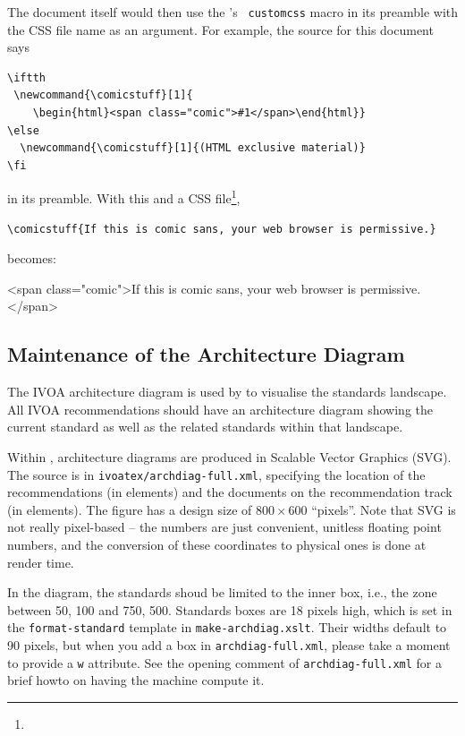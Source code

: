\documentclass[11pt,a4paper]{ivoa}
\newcommand{\texword}[1]{\texttt{\color{texcolor} #1}}
\newcommand{\comicstuff}[1]{
    \begin{html}<span class="comic">#1</span>\end{html}}
\newcommand{\comicstuff}[1]{(HTML exclusive material)}
\begin{document}
The document itself would then use the \ivoatex's \texword{customcss}
macro in its preamble with the CSS file name as an argument.  For
example, the source for this document says

\begin{lstlisting}
\iftth
 \newcommand{\comicstuff}[1]{
    \begin{html}<span class="comic">#1</span>\end{html}}
\else
  \newcommand{\comicstuff}[1]{(HTML exclusive material)}
\fi
\end{lstlisting}

\noindent in its preamble.  With this and a CSS
file\footnote{},

\begin{lstlisting}
\comicstuff{If this is comic sans, your web browser is permissive.}
\end{lstlisting}

\noindent becomes:
\comicstuff{If this is comic sans, your web browser is permissive.}

\subsection{Maintenance of the Architecture Diagram}

The IVOA architecture diagram is used by
\citet{2021ivoa.spec.1101D} to
visualise the standards landscape.  All IVOA recommendations should have
an architecture diagram showing the current standard as well as the
related standards within that landscape.

Within \ivoatex, architecture diagrams are produced in Scalable Vector
Graphics (SVG).  The source is in \texttt{ivoatex/archdiag-full.xml},
specifying the location of the recommendations (in  elements)
and the documents on the recommendation track (in 
elements).  The figure has a design size of $800\times 600$ ``pixels''.
Note that SVG is not really pixel-based -- the numbers are just
convenient, unitless floating point numbers, and the conversion of these
coordinates to physical ones is done at render time.

In the diagram, the standards shoud be limited to the inner box, i.e.,
the zone between 50, 100 and 750, 500.  Standards boxes are
18 pixels high, which is set in the \texttt{format-standard} template
in \texttt{make-archdiag.xslt}.  Their widths default to 90 pixels, but
when you add a box in \verb|archdiag-full.xml|, please take a moment to
provide a \verb|w| attribute.  See the opening comment of
\verb|archdiag-full.xml| for a brief howto on having the machine compute
it.
\end{document}
